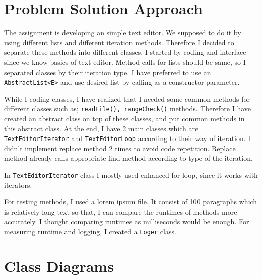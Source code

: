 \documentclass[a4paper]{article}
\begin{document}
\begin{large}
\newpage

\setcounter{section}{0}

\section{Problem Solution Approach}


The assignment is developing an simple text editor. We supposed to do it by using different lists and different iteration methods. Therefore I decided to separate these methods into different classes. I started by coding and interface since we know basics of text editor. Method calls for lists should be same, so I separated classes by their iteration type. I have preferred to use an \texttt{AbstractList<E>} and use desired list by calling as a constructor parameter.
\vspace{1em}

While I coding classes, I have realized that I needed some common methods for different classes such as; \texttt{readFile(), rangeCheck()} methods. Therefore I have created an abstract class on top of these classes, and put common methods in this abstract class. At the end, I have 2 main classes which are \texttt{TextEditorIterator} and \texttt{TextEditorLoop} according to their way of iteration. I didn't implement replace method 2 times to avoid code repetition. Replace method already calls appropriate find method according to type of the iteration.
\vspace{1em}

In \texttt{TextEditorIterator} class I mostly used enhanced for loop, since it works with iterators.
\vspace{1em}

For testing methods, I used a lorem ipsum file. It consist of 100 paragraphs which is relatively long text so that, I can compare the runtimes of methods more accurately. I thought comparing runtimes as milliseconds would be enough. For measuring runtime and logging, I created a \texttt{Loger} class.
\vspace{1em}

\newpage

\section{Class Diagrams}


\end{large}
\end{document}
